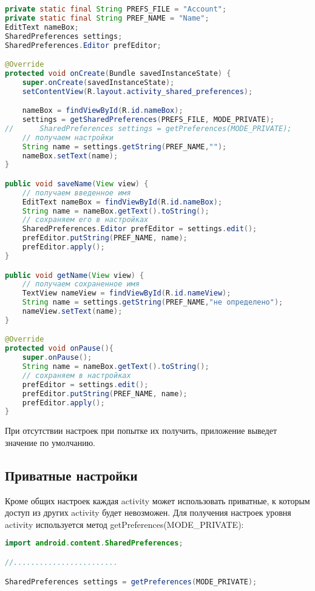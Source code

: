 \begin{lstlisting}[language=Java
	, label=lst:
	]
private static final String PREFS_FILE = "Account";
private static final String PREF_NAME = "Name";
EditText nameBox;
SharedPreferences settings;
SharedPreferences.Editor prefEditor;

@Override
protected void onCreate(Bundle savedInstanceState) {
	super.onCreate(savedInstanceState);
	setContentView(R.layout.activity_shared_preferences);

	nameBox = findViewById(R.id.nameBox);
	settings = getSharedPreferences(PREFS_FILE, MODE_PRIVATE);
//		SharedPreferences settings = getPreferences(MODE_PRIVATE);
	// получаем настройки
	String name = settings.getString(PREF_NAME,"");
	nameBox.setText(name);
}

public void saveName(View view) {
	// получаем введенное имя
	EditText nameBox = findViewById(R.id.nameBox);
	String name = nameBox.getText().toString();
	// сохраняем его в настройках
	SharedPreferences.Editor prefEditor = settings.edit();
	prefEditor.putString(PREF_NAME, name);
	prefEditor.apply();
}

public void getName(View view) {
	// получаем сохраненное имя
	TextView nameView = findViewById(R.id.nameView);
	String name = settings.getString(PREF_NAME,"не определено");
	nameView.setText(name);
}

@Override
protected void onPause(){
	super.onPause();
	String name = nameBox.getText().toString();
	// сохраняем в настройках
	prefEditor = settings.edit();
	prefEditor.putString(PREF_NAME, name);
	prefEditor.apply();
}
\end{lstlisting}

При отсутствии настроек при попытке их получить, приложение выведет
значение по умолчанию.

\subsection{Приватные настройки}
Кроме общих настроек каждая activity может использовать приватные, к
которым доступ из других activity будет невозможен. Для получения
настроек уровня activity используется метод
getPreferences(MODE\_PRIVATE):

\begin{lstlisting}[language=Java
	, label=lst:
	]
import android.content.SharedPreferences;

//........................

SharedPreferences settings = getPreferences(MODE_PRIVATE);
\end{lstlisting}


